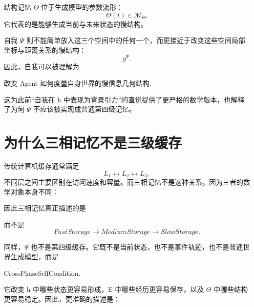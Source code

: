 结构记忆 $\Theta$ 位于生成模型的参数流形：
\[
\Theta(t)
\in
\mathcal{M}_\Theta.
\]
它代表的是能够生成当前与未来状态的慢结构。

自我 $\Psi$ 则不能简单放入这三个空间中的任何一个，而更接近于改变这些空间局部坐标与距离关系的慢结构：
\[
g^\Psi.
\]
因此，自我可以被理解为
\begin{statementbox}
改变 Agent 如何度量自身世界的慢信息几何结构.
\end{statementbox}
这为此前“自我在 h 中表现为背景引力”的直觉提供了更严格的数学版本，也解释了为何 $\Psi$ 不应该被实现成普通第四级记忆。

\section{为什么三相记忆不是三级缓存}

传统计算机缓存通常满足
\[
L_1
\leftrightarrow
L_2
\leftrightarrow
L_3,
\]
不同层之间主要区别在访问速度和容量。而三相记忆不是这种关系，因为三者的数学对象本身不同：
\begin{statementbox}
\centering
{}
\end{statementbox}
\begin{statementbox}
\centering
{}
\end{statementbox}
\begin{statementbox}
\centering
{}
\end{statementbox}
因此三相记忆真正描述的是
\begin{statementbox}
\centering
{}
\end{statementbox}
而不是
\[
FastStorage
\rightarrow
MediumStorage
\rightarrow
SlowStorage.
\]

同样，$\Psi$ 也不是第四级缓存。它既不是当前状态，也不是事件轨迹，也不是普通世界生成模型，而是
\begin{statementbox}
CrossPhaseSelfCondition.
\end{statementbox}
它改变 h 中哪些状态更容易形成，E 中哪些经历更容易保存，以及 $\Theta$ 中哪些结构更容易稳定。因此，更准确的描述是：
\begin{statementbox}
\centering
{}
\end{statementbox}

